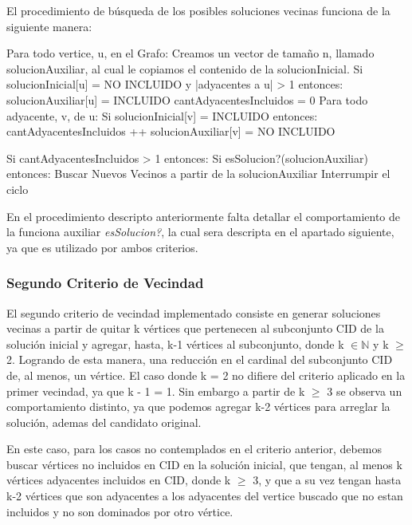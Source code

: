El procedimiento de búsqueda de los posibles soluciones vecinas funciona de la siguiente manera:
\medskip

\begin{codesnippet}
Para todo vertice, u, en el Grafo:
  Creamos un vector de tamaño n, llamado solucionAuxiliar, al cual le copiamos
  el contenido de la solucionInicial.
  Si solucionInicial[u] = NO INCLUIDO y |adyacentes a u| > 1 entonces:
     solucionAuxiliar[u] = INCLUIDO
     cantAdyacentesIncluidos = 0
     Para todo adyacente, v, de u:
         Si solucionInicial[v] = INCLUIDO entonces:
             cantAdyacentesIncluidos ++
             solucionAuxiliar[v] = NO INCLUIDO

  Si cantAdyacentesIncluidos > 1 entonces:
     Si esSolucion?(solucionAuxiliar) entonces:
       Buscar Nuevos Vecinos a partir de la solucionAuxiliar
       Interrumpir el ciclo
\end{codesnippet}

En el procedimiento descripto anteriormente falta detallar el comportamiento de la funciona auxiliar \textit{esSolucion?}, la cual sera descripta en el apartado siguiente, ya que es utilizado por ambos criterios.

\subsubsection{Segundo Criterio de Vecindad}
El segundo criterio de vecindad implementado consiste en generar soluciones vecinas a partir de quitar k vértices que pertenecen al subconjunto CID de la solución inicial y agregar, hasta, k-1 vértices al subconjunto, donde k $\in \mathbb{N}$ y k $\geq$ 2. Logrando de esta manera, una reducción en el cardinal del subconjunto CID de, al menos, un vértice.
El caso donde k = 2 no difiere del criterio aplicado en la primer vecindad, ya que k - 1 = 1. Sin embargo a partir de k $\geq$ 3 se observa un comportamiento distinto, ya que podemos agregar k-2 vértices para arreglar la solución, ademas del candidato original.

En este caso, para los casos no contemplados en el criterio anterior, debemos buscar vértices no incluidos en CID en la solución inicial, que tengan, al menos k vértices adyacentes incluidos en CID, donde k $\geq$ 3, y que a su vez tengan hasta k-2 vértices que son adyacentes a los adyacentes del vertice buscado que no estan incluidos y no son dominados por otro vértice.

